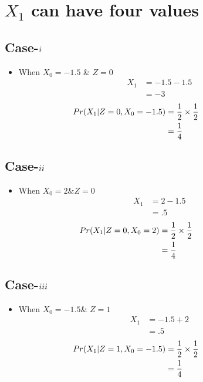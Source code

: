 \documentclass[11pt,a4paper,twocolumn]{article}
\begin{document}
    \section{\textbf{$X_{1}$ can have four values}}
        \subsection{Case-$\romannumeral1$} 
    \begin{itemize}
        \item When $X_{0}=-1.5$ \& $Z=0$
        \begin{align*}
         X_{1}&=-1.5-1.5\\
         &=-3
        \end{align*}
        \begin{align*}
        \hspace{-2cm}
          Pr(X_{1}|Z=0,X_{0}=-1.5)&=\frac{1}{2}\times\frac{1}{2}\\
        &=\frac{1}{4}
        \end{align*}
    \end{itemize}
        
      \subsection{Case-$\romannumeral2$}
      \begin{itemize}
          \item When $X_{0}=2 \& Z=0$
           \begin{align*}
         X_{1}&=2-1.5\\
         &=.5
         \end{align*}
          \begin{align*}
        \hspace{-2cm}
          Pr(X_{1}|Z=0,X_{0}=2)&=\frac{1}{2}\times\frac{1}{2}\\
        &=\frac{1}{4}
        \end{align*}
      \end{itemize}
       \subsection{Case-$\romannumeral3$}
       \begin{itemize}
           \item When $X_{0}=-1.5$\& $Z=1$
           \begin{align*}
         X_{1}&=-1.5+2\\
         &=.5
         \end{align*}
         \begin{align*}
        \hspace{-2cm}
          Pr(X_{1}|Z=1,X_{0}=-1.5)&=\frac{1}{2}\times\frac{1}{2}\\
        &=\frac{1}{4}
        \end{align*}
       \end{itemize}
\end{document}
